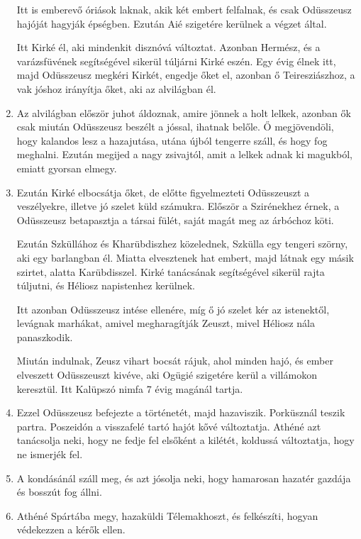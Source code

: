 \documentclass[]{article}
\begin{document}
\begin{enumerate}
				Itt is emberevő óriások laknak, akik két embert felfalnak, és csak Odüsszeusz hajóját hagyják épségben. Ezután Aié szigetére kerülnek a végzet által.
				
				Itt Kirké él, aki mindenkit disznóvá változtat. Azonban Hermész, és a varázsfüvének segítségével sikerül túljárni Kirké eszén. Egy évig élnek itt, majd Odüsszeusz megkéri Kirkét, engedje őket el, azonban ő Teiresziászhoz, a vak jóshoz irányítja őket, aki az alvilágban él.
				
				\item Az alvilágban először juhot áldoznak, amire jönnek a holt lelkek, azonban ők csak miután Odüsszeusz beszélt a jóssal, ihatnak belőle. Ő megjövendöli, hogy kalandos lesz a hazajutása, utána újból tengerre száll, és hogy fog meghalni. Ezután megijed a nagy zsivajtól, amit a lelkek adnak ki magukból, emiatt gyorsan elmegy.
				
				\item Ezután Kirké elbocsátja őket, de előtte figyelmezteti Odüsszeuszt a veszélyekre, illetve jó szelet küld számukra. Először a Szirénekhez érnek, a Odüsszeusz betapasztja a társai fülét, saját magát meg az árbóchoz köti.
				
				Ezután Szküllához és Kharübdiszhez közelednek, Szkülla egy tengeri szörny, aki egy barlangban él. Miatta elvesztenek hat embert, majd látnak egy másik szirtet, alatta Karübdisszel. Kirké tanácsának segítségével sikerül rajta túljutni, és Héliosz napistenhez kerülnek. 
				
				Itt azonban Odüsszeusz intése ellenére, míg ő jó szelet kér az istenektől, levágnak marhákat, amivel megharagítják Zeuszt, mivel Héliosz nála panaszkodik.
				
				Miután indulnak, Zeusz vihart bocsát rájuk, ahol minden hajó, és ember elveszett Odüsszeuszt kivéve, aki Ogügié szigetére kerül a villámokon keresztül. Itt Kalüpszó nimfa 7 évig magánál tartja.
				
				\item Ezzel Odüsszeusz befejezte a történetét, majd hazaviszik. Porküsznál teszik partra. Poszeidón a visszafelé tartó hajót kővé változtatja. Athéné azt tanácsolja neki, hogy ne fedje fel elsőként a kilétét, koldussá változtatja, hogy ne ismerjék fel.
				
				\item A kondásánál száll meg, és azt jósolja neki, hogy hamarosan hazatér gazdája és bosszút fog állni.
				
				\item Athéné Spártába megy, hazaküldi Télemakhoszt, és felkészíti, hogyan védekezzen a kérők ellen.
				

\end{enumerate}
\end{document}
